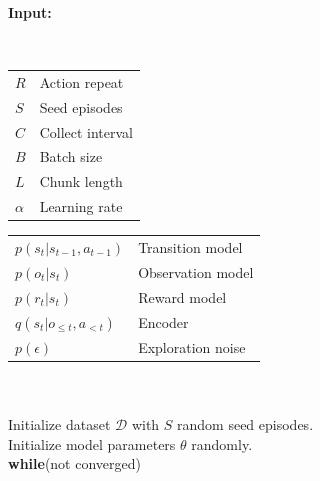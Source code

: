 \begin{algorithm}
\textbf{Input:}
{\\\hspace{-3.6em}\small
\begin{tabular}[t]{l @{\hspace{.5em}} l}%
$R$ & Action repeat \\
$S$ & Seed episodes \\
$C$ & Collect interval \\
$B$ & Batch size \\
$L$ & Chunk length \\
$\alpha$ & Learning rate \\
\end{tabular}\hspace{-0.5em}%
\begin{tabular}[t]{l @{\hspace{.5em}} l}%
$p(s_t|s_{t-1},a_{t-1})$ & Transition model \\
$p(o_t|s_t)$ & Observation model \\
$p(r_t|s_t)$ & Reward model \\
$q(s_t|o_{\leq t},a_{<t})$ & Encoder \\
$p(\epsilon)$ & Exploration noise \\
\end{tabular}%
}
\\
\\Initialize dataset $\mathcal{D}$ with $S$ random seed episodes.
\\Initialize model parameters $\theta$ randomly. \;
\\
\textbf{while}{(not converged)}{
	 \\
  \\
  \\
  \\
  }
\end{algorithm}
